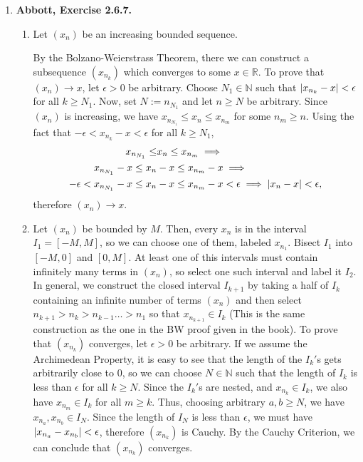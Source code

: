 \documentclass{article}
\DeclarePairedDelimiter\abs{\lvert}{\rvert}
\newcommand{\N}{\mathbb{N}}
\newcommand{\R}{\mathbb{R}}
\newcommand{\exc}[2][Abbott]{\item \textbf{#1, Exercise #2.}}
\newcommand{\lep}[1][L]{#1et $\epsilon > 0$ be arbitrary}
\begin{document}
\begin{enumerate}
\begin{enumerate}
        \item 
    \end{enumerate}
    
    \exc{2.6.7}
    \begin{enumerate}
        \item Let $(x_n)$ be an increasing bounded sequence. 
        
        By the Bolzano-Weierstrass Theorem, there we can construct a subsequence $(x_{n_k})$ which converges to some $x \in \R$. To prove that $(x_n) \to x$, \lep[l]. Choose $N_1 \in \N$ such that $\abs*{x_{n_k}-x} < \epsilon$ for all $k \geq N_1$. Now, set $N := n_{N_1}$ and let $n \geq N$ be arbitrary. Since $(x_n)$ is increasing, we have $x_{n_{N_1}} \leq x_n \leq x_{n_m}$ for some $n_m \geq n$. Using the fact that $-\epsilon< x_{n_k} -x < \epsilon$ for all $k \geq N_1$, 
        \begin{align*}
            x_{n_{N_1}} \leq &x_n \leq x_{n_m} \implies \\
            x_{n_{N_1}}-x \leq x_n&-x \leq x_{n_m}-x \implies \\
            -\epsilon < x_{n_{N_1}}-x \leq x_n&-x \leq x_{n_m}-x < \epsilon \implies
            \abs*{x_n-x} < \epsilon,
        \end{align*} therefore $(x_n) \to x$.
        
        \item Let $(x_n)$ be bounded by $M$. Then, every $x_n$ is in the interval $I_1 = [-M,M]$, so we can choose one of them, labeled $x_{n_1}$. Bisect $I_1$ into $[-M, 0]$ and $[0, M]$. At least one of this intervals must contain infinitely many terms in $(x_n)$, so select one such interval and label it $I_2$. In general, we construct the closed interval $I_{k+1}$ by taking a half of $I_k$ containing an infinite number of terms $(x_n)$ and then select $n_{k+1} > n_k > n_{k-1} \dots > n_1$ so that $x_{n_{k+1}} \in I_k$ (This is the same construction as the one in the BW proof given in the book). To prove that $(x_{n_k})$ converges, \lep[l]. If we assume the Archimedean Property, it is easy to see that the length of the $I_k'$s gets arbitrarily close to $0$, so we can choose $N \in \N$ such that the length of $I_k$ is less than $\epsilon$ for all $k \geq N$. Since the $I_k'$s are nested, and $x_{n_k} \in I_k$, we also have $x_{n_m} \in I_k$ for all $m \geq k$. Thus, choosing arbitrary $a,b \geq N$, we have $x_{n_a},x_{n_b} \in I_N$. Since the length of $I_N$ is less than $\epsilon$, we must have $\abs*{x_{n_a}-x_{n_b}} < \epsilon$, therefore $(x_{n_k})$ is Cauchy. By the Cauchy Criterion, we can conclude that $(x_{n_k})$ converges.
        

\end{enumerate}
\end{enumerate}
\end{document}
